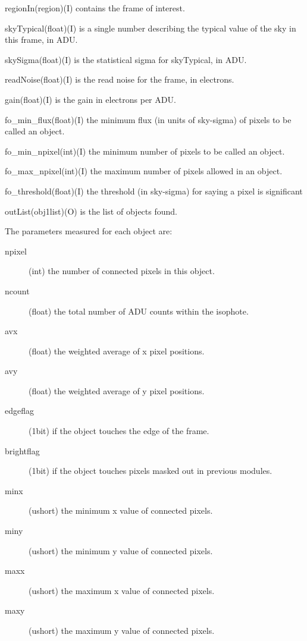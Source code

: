\begin{arguments}
\item{\quad regionIn}(region)(I) contains the frame of interest.
\item{\quad skyTypical}(float)(I) is a single number describing the 
             typical value of the sky in this frame, in ADU.
\item{\quad skySigma}(float)(I) is the statistical sigma for 
             skyTypical, in ADU.
\item{\quad readNoise}(float)(I) is the read noise for the frame, in electrons.
\item{\quad gain}(float)(I) is the gain in electrons per ADU.
\item{\quad fo\_min\_flux}(float)(I) the minimum flux (in units of sky-sigma) 
             of pixels to be called an object.
\item{\quad fo\_min\_npixel}(int)(I) the minimum number of pixels to be 
             called an object.
\item{\quad fo\_max\_npixel}(int)(I) the maximum number of pixels allowed 
             in an object.
\item{\quad fo\_threshold}(float)(I) the threshold (in sky-sigma)  
             for saying a pixel is significant
\item{\quad outList}(obj1list)(O) is the list of objects found. 
\end{arguments}
The parameters measured for each object are: 
\begin{description}
  \item[\qquad npixel](int) the number of connected pixels in this object.
  \item[\qquad ncount](float) the total number of ADU counts within 
                  the isophote.
  \item[\qquad avx](float) the weighted average of x pixel positions.
  \item[\qquad avy](float) the weighted average of y pixel positions.
  \item[\qquad edgeflag](1bit) if the object touches the edge of the frame.
  \item[\qquad brightflag](1bit) if the object touches pixels masked out 
                  in previous modules.
  \item[\qquad minx](ushort) the minimum x value of connected pixels.
  \item[\qquad miny](ushort) the minimum y value of connected pixels.
  \item[\qquad maxx](ushort) the maximum x value of connected pixels.
  \item[\qquad maxy](ushort) the maximum y value of connected pixels.
\end{description}

